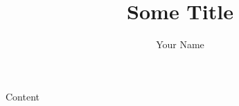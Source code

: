 \documentclass[a4paper,11pt]{article}
\title{Some Title}
\author{Your Name}
\begin{document}
Content
\end{document}

